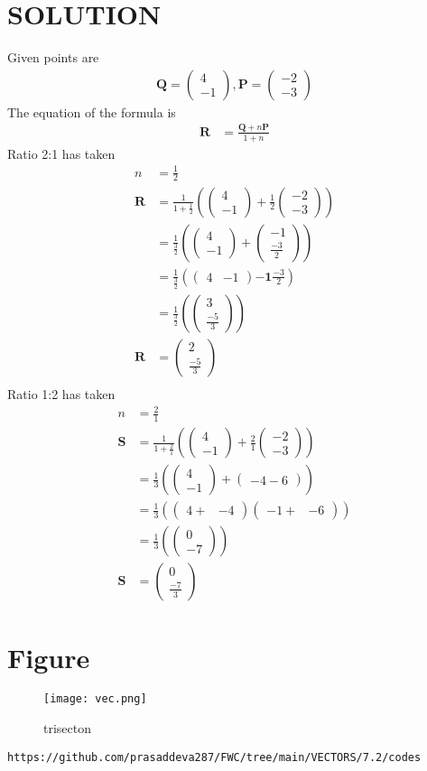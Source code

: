 \documentclass[12pt]{article}
\providecommand{\brak}[1]{\ensuremath{\left(#1\right)}}
\newcommand{\myvec}[1]{\ensuremath{\begin{pmatrix}#1\end{pmatrix}}}
\let\vec\mathbf
\begin{document}
\section{SOLUTION}
Given points are
\begin{align}
\vec{Q}=\myvec{4\\ -1} ,
\vec{P}=\myvec{-2\\ -3}
\end{align}
The equation of the formula is
\begin{align}
\vec{R}&=\frac{\vec{Q}+n\vec{P}}{1+n}
\end{align}
Ratio 2:1 has taken 
\begin{align}
n&=\frac{1}{2}\\
\vec{R}&=\frac{1}{1+\frac{1}{2}}\brak{\myvec{4\\-1}+\frac{1}{2}\myvec{-2\\-3}}\\
&=\frac{1}{\frac{3}{2}}\brak{\myvec{4\\ -1}+\myvec{-1\\ \frac{-3}{2}}}\\
&=\frac{1}{\frac{3}{2}}\brak {\myvec{4&-1} {\vec{-1} \frac{-3}{2}}}\\
&=\frac{1}{\frac{3}{2}}\brak {\myvec{3\\ \frac{-5}{3}}}\\
\vec{R}&=\myvec{2\\ \frac{-5}{3}}\\
\end{align}
Ratio 1:2 has taken
\begin{align}
n&=\frac{2}{1}\\
\vec{S}&=\frac{1}{1+\frac{2}{1}}\brak{\myvec{4\\-1}+\frac{2}{1}\myvec{-2\\-3}}\\
&=\frac{1}{3}\brak{\myvec{4\\ -1}+\myvec{-4-6}}\\
&=\frac{1}{3}\brak{\myvec{4+& -4}\myvec{-1+&-6}}\\
&=\frac{1}{3}\brak{\myvec{0\\ -7}}\\
\vec{S}&=\myvec{0\\ \frac{-7}{3}}
\end{align}
\section{Figure}
\begin{figure}[h]
\centering
\texttt{[image: vec.png]}
\caption{trisecton}
		\label{fig:Figure}
\end{figure}
\begin{lstlisting}
https://github.com/prasaddeva287/FWC/tree/main/VECTORS/7.2/codes
\end{lstlisting}
\end{document}
